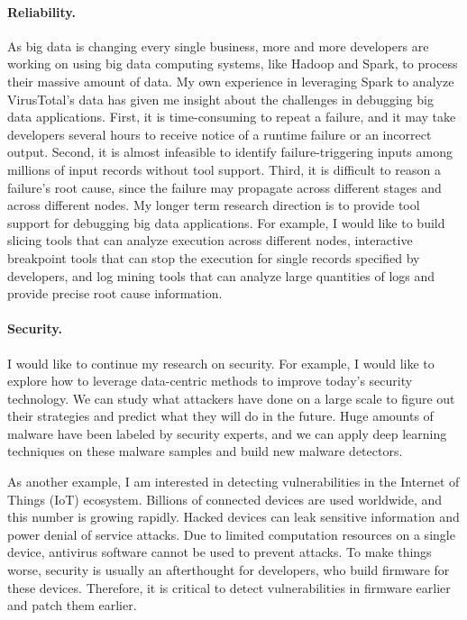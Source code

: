 \documentclass[10pt]{article}
\begin{document}
\paragraph{Reliability.} 
As big data is changing every single business, 
more and more developers are working on using big data computing systems, 
like Hadoop and Spark, to process their massive amount of data. 
My own experience in leveraging Spark to analyze VirusTotal's data 
has given me insight about the challenges in debugging big data applications. 
First, it is time-consuming to repeat a failure, and it may take developers several hours to receive notice of a runtime failure or an incorrect output.
Second, it is almost infeasible to identify failure-triggering inputs among millions of input records without tool support. 
Third, it is difficult to reason a failure's root cause, since the failure may propagate across different stages and across different nodes. 
My longer term research direction is to provide tool support for debugging big data applications.
For example, I would like to build slicing tools that can analyze execution across different nodes, 
interactive breakpoint tools that can stop the execution for single records specified by developers, 
and log mining tools that can analyze large quantities of logs and provide precise root cause information. 


\vspace{-.1in}
\paragraph{Security.} 
I would like to continue my research on security. 
For example, I would like to explore how to leverage data-centric methods to improve today's security technology. 
We can study what attackers have done on a large scale to figure out their strategies and predict what they will do in the future. 
Huge amounts of malware have been labeled by security experts, 
and we can apply deep learning techniques on these malware samples and build new malware detectors.

As another example, I am interested in detecting vulnerabilities in the Internet of Things (IoT) ecosystem. 
Billions of connected devices are used worldwide, 
and this number is growing rapidly. 
Hacked devices can leak sensitive information and power denial of service attacks. 
Due to limited computation resources on a single device, 
antivirus software cannot be used to prevent attacks. 
To make things worse, security is usually an afterthought for developers, who build firmware for these devices. 
Therefore, it is critical to detect vulnerabilities in firmware earlier and patch them earlier. 



\newpage


\end{document}
